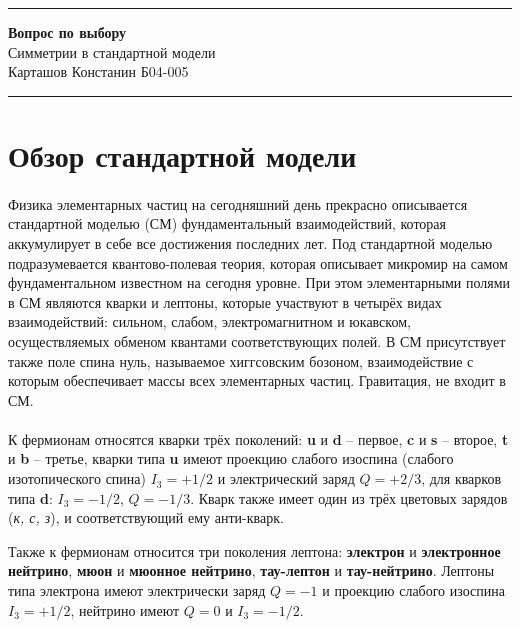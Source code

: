 \documentclass[a4paper,12pt]{article} %
\begin{document}


\hrule 	
\medskip
\begin{raggedright}
{\large \textbf{Вопрос по выбору}}
\\
\medskip
{\Large Симметрии в стандартной модели} 
\\
\medskip
{\large Карташов Констанин Б04-005}
\medskip
\hrule
\medskip
\end{raggedright}


\section{Обзор стандартной модели}

\paragraph{} Физика элементарных частиц на сегодняшний день прекрасно описывается стандартной моделью (СМ) фундаментальный взаимодействий, которая аккумулирует в себе все достижения последних лет. Под стандартной моделью подразумевается квантово-полевая теория, которая описывает микромир на самом фундаментальном известном на сегодня уровне. При этом элементарными полями в СМ являются кварки и лептоны, которые участвуют в четырёх видах взаимодействий: сильном, слабом, электромагнитном и юкавском, осуществляемых обменом квантами соответствующих полей. В СМ присутствует также поле спина нуль, называемое хиггсовским бозоном, взаимодействие с которым обеспечивает массы всех элементарных частиц. Гравитация, не входит в СМ.

\paragraph{} К фермионам относятся кварки трёх поколений: \textbf{u} и \textbf{d} -- первое, \textbf{c} и \textbf{s} -- второе, \textbf{t} и \textbf{b} -- третье, кварки типа \textbf{u} имеют проекцию слабого изоспина (слабого изотопического спина) $I_3 = +1/2$ и электрический заряд $Q = +2/3$, для кварков типа \textbf{d}: $I_3 = -1/2$, $Q = -1/3$. Кварк также имеет один из трёх цветовых зарядов (\textit{к, с, з}), и соответствующий ему анти-кварк.

Также к фермионам относится три поколения лептона: \textbf{электрон} и \textbf{электронное нейтрино}, \textbf{мюон} и \textbf{мюонное нейтрино}, \textbf{тау-лептон} и \textbf{тау-нейтрино}. Лептоны типа электрона имеют электрически заряд $Q = -1$ и проекцию слабого изоспина $I_3 = +1/2$, нейтрино имеют $Q = 0$ и $I_3 = -1/2$.
\end{document}
